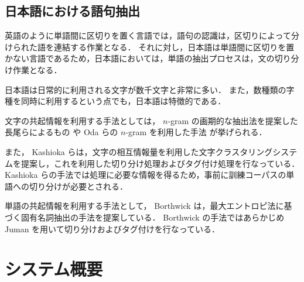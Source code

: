 \subsection{日本語における語句抽出}
英語のように単語間に区切りを置く言語では，語句の認識は，区切りによって分けられた語を連結する作業となる．
それに対し，日本語は単語間に区切りを置かない言語であるため，日本語においては，単語の抽出プロセスは，文の切り分け作業となる．

日本語は日常的に利用される文字が数千文字と非常に多い．
また，数種類の字種を同時に利用するという点でも，日本語は特徴的である．

文字の共起情報を利用する手法としては， $n$-gram の画期的な抽出法を提案した長尾らによるもの\cite{nagao94} や Oda らの $n$-gram を利用した手法\cite{oda99} が挙げられる．

また， Kashioka らは，文字の相互情報量を利用した文字クラスタリングシステムを提案し，これを利用した切り分け処理およびタグ付け処理を行なっている\cite{kashioka98}．
Kashioka らの手法では処理に必要な情報を得るため，事前に訓練コーパスの単語への切り分けが必要とされる．

単語の共起情報を利用する手法として， Borthwick は，最大エントロピ法に基づく固有名詞抽出の手法を提案している\cite{borthwick99}．
Borthwick の手法ではあらかじめ Juman を用いて切り分けおよびタグ付けを行なっている．
\section{システム概要}
